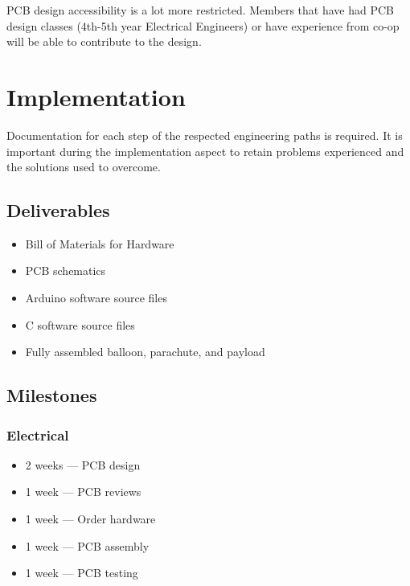\documentclass[conference]{IEEEtran} %
\begin{document}
PCB design accessibility is a lot more restricted. Members that have had PCB
design classes (4th-5th year Electrical Engineers) or have experience from co-op
will be able to contribute to the design.



\section{Implementation}
\label{sec:implementation}
Documentation for each step of the respected engineering paths is required. It
is important during the implementation aspect to retain problems experienced and
the solutions used to overcome.

\subsection{Deliverables}
\label{subsec:deliverables}
\begin{itemize}
    \item Bill of Materials for Hardware
    \item PCB schematics
    \item Arduino software source files
    \item C software source files
    \item Fully assembled balloon, parachute, and payload
\end{itemize}

\subsection{Milestones}
\label{subsec:milestones}
\subsubsection*{Electrical}
\begin{itemize}
    \item 2 weeks --- PCB design
    \item 1 week --- PCB reviews
    \item 1 week --- Order hardware
    \item 1 week --- PCB assembly
    \item 1 week --- PCB testing
\end{itemize}
\end{document}
